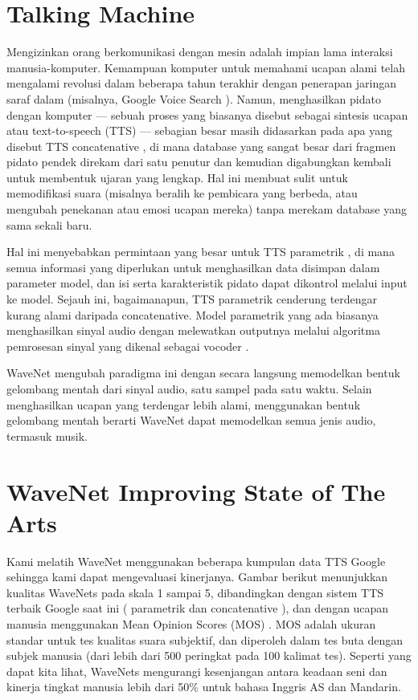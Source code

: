 \section{Talking Machine}
Mengizinkan orang berkomunikasi dengan mesin adalah impian lama interaksi manusia-komputer. Kemampuan komputer untuk memahami ucapan alami telah mengalami revolusi dalam beberapa tahun terakhir dengan penerapan jaringan saraf dalam (misalnya, Google Voice Search ). Namun, menghasilkan pidato dengan komputer — sebuah proses yang biasanya disebut sebagai sintesis ucapan atau text-to-speech (TTS) — sebagian besar masih didasarkan pada apa yang disebut TTS concatenative , di mana database yang sangat besar dari fragmen pidato pendek direkam dari satu penutur dan kemudian digabungkan kembali untuk membentuk ujaran yang lengkap. Hal ini membuat sulit untuk memodifikasi suara (misalnya beralih ke pembicara yang berbeda, atau mengubah penekanan atau emosi ucapan mereka) tanpa merekam database yang sama sekali baru.

Hal ini menyebabkan permintaan yang besar untuk TTS parametrik , di mana semua informasi yang diperlukan untuk menghasilkan data disimpan dalam parameter model, dan isi serta karakteristik pidato dapat dikontrol melalui input ke model. Sejauh ini, bagaimanapun, TTS parametrik cenderung terdengar kurang alami daripada concatenative. Model parametrik yang ada biasanya menghasilkan sinyal audio dengan melewatkan outputnya melalui algoritma pemrosesan sinyal yang dikenal sebagai vocoder .

WaveNet mengubah paradigma ini dengan secara langsung memodelkan bentuk gelombang mentah dari sinyal audio, satu sampel pada satu waktu. Selain menghasilkan ucapan yang terdengar lebih alami, menggunakan bentuk gelombang mentah berarti WaveNet dapat memodelkan semua jenis audio, termasuk musik.

\section{WaveNet Improving State of The Arts}
Kami melatih WaveNet menggunakan beberapa kumpulan data TTS Google sehingga kami dapat mengevaluasi kinerjanya. Gambar berikut menunjukkan kualitas WaveNets pada skala 1 sampai 5, dibandingkan dengan sistem TTS terbaik Google saat ini ( parametrik  dan  concatenative ), dan dengan ucapan manusia menggunakan  Mean Opinion Scores (MOS) . MOS adalah ukuran standar untuk tes kualitas suara subjektif, dan diperoleh dalam tes buta dengan subjek manusia (dari lebih dari 500 peringkat pada 100 kalimat tes). Seperti yang dapat kita lihat, WaveNets mengurangi kesenjangan antara keadaan seni dan kinerja tingkat manusia lebih dari 50\% untuk bahasa Inggris AS dan Mandarin.

